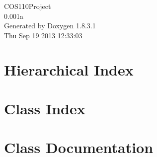 \documentclass{book}
\begin{document}
\hypersetup{pageanchor=false,citecolor=blue}
\begin{titlepage}
\vspace*{7cm}
\begin{center}
{\Large C\-O\-S110\-Project \\[1ex]\large 0.\-001a }\\
\vspace*{1cm}
{\large Generated by Doxygen 1.8.3.1}\\
\vspace*{0.5cm}
{\small Thu Sep 19 2013 12:33:03}\\
\end{center}
\end{titlepage}
\clearemptydoublepage
{}
\tableofcontents
\clearemptydoublepage
{}
\hypersetup{pageanchor=true,citecolor=blue}
\chapter{Hierarchical Index}

\chapter{Class Index}

\chapter{Class Documentation}
























\printindex
\end{document}
